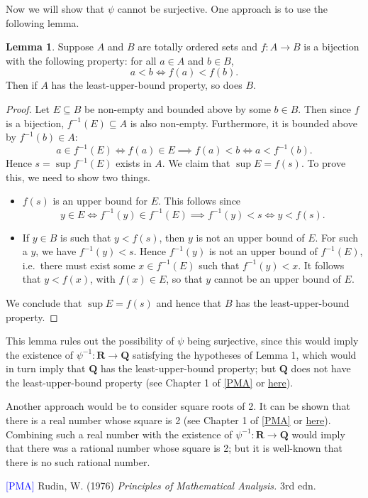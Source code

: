 \documentclass[12pt]{article}
\newcommand{\newp}{\vspace{5mm}}
\newcommand{\Q}{\mathbf{Q}}
\newcommand{\R}{\mathbf{R}}
\theoremstyle{definition}
\newtheorem{lemma}{Lemma}
\begin{document}
Now we will show that \( \psi \) cannot be surjective. One approach is to use the following lemma.

\begin{lemma}
    Suppose \( A \) and \( B \) are totally ordered sets and \( f : A \to B \) is a bijection with the following property: for all \( a \in A \) and \( b \in B \),
    \[
        a < b \iff f(a) < f(b).
    \]
    Then if \( A \) has the least-upper-bound property, so does \( B \).
\end{lemma}

\begin{proof}
    Let \( E \subseteq B \) be non-empty and bounded above by some \( b \in B \). Then since \( f \) is a bijection, \( f^{-1}(E) \subseteq A \) is also non-empty. Furthermore, it is bounded above by \( f^{-1}(b) \in A \):
    \[
        a \in f^{-1}(E) \iff f(a) \in E \implies f(a) < b \iff a < f^{-1}(b).
    \]
    Hence \( s = \sup f^{-1}(E) \) exists in \( A \). We claim that \( \sup E = f(s) \). To prove this, we need to show two things.
    \begin{itemize}
        \item \( f(s) \) is an upper bound for \( E \). This follows since
        \[
            y \in E \iff f^{-1}(y) \in f^{-1}(E) \implies f^{-1}(y) < s \iff y < f(s).
        \]

        \item If \( y \in B \) is such that \( y < f(s) \), then \( y \) is not an upper bound of \( E \). For such a \( y \), we have \( f^{-1}(y) < s \). Hence \( f^{-1}(y) \) is not an upper bound of \( f^{-1}(E) \), i.e.\ there must exist some \( x \in f^{-1}(E) \) such that \( f^{-1}(y) < x \). It follows that \( y < f(x) \), with \( f(x) \in E \), so that \( y \) cannot be an upper bound of \( E \).
    \end{itemize}
    We conclude that \( \sup E = f(s) \) and hence that \( B \) has the least-upper-bound property.
\end{proof}

This lemma rules out the possibility of \( \psi \) being surjective, since this would imply the existence of \( \psi^{-1} : \R \to \Q \) satisfying the hypotheses of Lemma 1, which would in turn imply that \( \Q \) has the least-upper-bound property; but \( \Q \) does not have the least-upper-bound property (see Chapter 1 of \hyperlink{pma}{[PMA]} or \href{https://lew98.github.io/Mathematics/Q_does_not_have_the_least_upper_bound_property.pdf}{here}).

\newp

Another approach would be to consider square roots of 2. It can be shown that there is a real number whose square is 2 (see Chapter 1 of \hyperlink{pma}{[PMA]} or \href{https://lew98.github.io/Mathematics/Consequences_of_the_least_upper_bound_property_of_R.pdf}{here}). Combining such a real number with the existence of \( \psi^{-1} : \R \to \Q \) would imply that there was a rational number whose square is 2; but it is well-known that there is no such rational number.

\hrulefill

\hypertarget{pma}{\textcolor{blue}{[PMA]} Rudin, W. (1976) \textit{Principles of Mathematical Analysis.} 3rd edn.}
\end{document}
